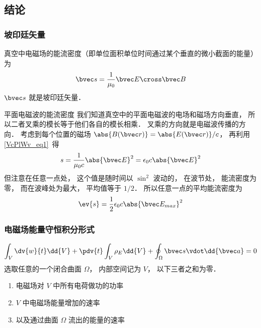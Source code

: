 


\subsection{结论}

\subsubsection{坡印廷矢量}
真空中电磁场的能流密度（即单位面积单位时间通过某个垂直的微小截面的能量）为 %
\begin{equation}
\bvec s = \frac{1}{\mu_0} \bvec E \cross \bvec B
\end{equation} 
$\bvec s$ 就是坡印廷矢量．

\begin{example}{平面电磁波的能流密度}\label{EBS_ex1}
我们知道真空中的平面电磁波的电场和磁场方向垂直， 所以二者叉乘的模长等于他们各自的模长相乘． 叉乘的方向就是电磁波传播的方向． 考虑到每个位置的磁场 $\abs{B(\bvec r)} = \abs{E(\bvec r)}/c$， 再利用\autoref{VcPlWv_eq1}~得
\begin{equation}
s = \frac{1}{\mu_0 c} \abs{\bvec E}^2 = \epsilon_0 c \abs{\bvec E}^2
\end{equation}
但注意在任意一点处， 这个值是随时间以 $\sin^2$ 波动的， 在波节处， 能流密度为零， 而在波峰处为最大， 平均值等于 $1/2$． %
所以任意一点的平均能流密度为
\begin{equation}
\ev{s} = \frac{1}{2} \epsilon_0 c \abs{\bvec E_{max}}^2
\end{equation}
\end{example}

\subsubsection{电磁场能量守恒积分形式}
\begin{equation}
\int_V \dv{w}{t} \dd{V}  + \pdv{t} \int_V \rho_E \dd{V}  + \oint_\Omega  \bvec s \vdot \dd{\bvec a}  = 0
\end{equation} 
选取任意的一个闭合曲面 $\Omega $， 内部空间记为 $V$， 以下三者之和为零．
\begin{enumerate}
\item 电磁场对 $V$ 中所有电荷做功的功率
\item $V$ 中电磁场能量增加的速率
\item 以及通过曲面 $\Omega $ 流出的能量的速率
\end{enumerate}

